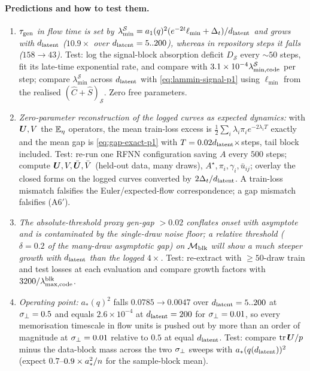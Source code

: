\paragraph{Predictions and how to test them.}
\begin{enumerate}
\item \emph{$\tau_{\mathrm{gen}}$ in flow time is set by $\lambda^{\mathcal S}_{\min}=a_1(q)^2(e^{-2t}\ell_{\min}+\Delta_t)/d_{\mathrm{latent}}$ and grows with $d_{\mathrm{latent}}$ ($10.9\times$ over $d_{\mathrm{latent}}=5..200$), whereas in repository steps it falls ($158\to43$).} Test: log the signal-block absorption deficit $D_{\mathcal S}$ every $\sim50$ steps, fit its late-time exponential rate, and compare with $3.1\times10^{-4}\lambda^{\mathcal S}_{\min,\rm code}$ per step; compare $\lambda^{\mathcal S}_{\min}$ across $d_{\mathrm{latent}}$ with \eqref{eq:lammin-signal-p1} using $\ell_{\min}$ from the realised $(\hat C+\hat S)_{\mathcal S}$. Zero free parameters.
\item \emph{Zero-parameter reconstruction of the logged curves as expected dynamics:} with $\bm{U},V$ the $\mathbb{E}_\eta$ operators, the mean train-loss excess is $\tfrac12\sum_i\lambda_i\pi_ie^{-2\lambda_iT}$ exactly and the mean gap is \eqref{eq:gap-exact-p1} with $T=0.02d_{\mathrm{latent}}\times$steps, tail block included. Test: re-run one RFNN configuration saving $A$ every $500$ steps; compute $\bm{U},V,\bar{\bm{U}},\bar V$ (held-out data, many draws), $A^\star,\pi_i,\gamma_i,\bar u_{ij}$; overlay the closed forms on the logged curves converted by $2\Delta_t/d_{\mathrm{latent}}$. A train-loss mismatch falsifies the Euler/expected-flow correspondence; a gap mismatch falsifies (A6$'$).
\item \emph{The absolute-threshold proxy gen-gap $>0.02$ conflates onset with asymptote and is contaminated by the single-draw noise floor; a relative threshold ($\delta=0.2$ of the many-draw asymptotic gap) on $\mathcal M_{\rm blk}$ will show a much steeper growth with $d_{\mathrm{latent}}$ than the logged $4\times$.} Test: re-extract with $\ge50$-draw train and test losses at each evaluation and compare growth factors with $3200/\lambda^{\rm blk}_{\max,\rm code}$.
\item \emph{Operating point:} $a_*(q)^2$ falls $0.0785\to0.0047$ over $d_{\mathrm{latent}}=5..200$ at $\sigma_{\perp}=0.5$ and equals $2.6\times10^{-4}$ at $d_{\mathrm{latent}}=200$ for $\sigma_{\perp}=0.01$, so every memorisation timescale in flow units is pushed out by more than an order of magnitude at $\sigma_{\perp}=0.01$ relative to $0.5$ at equal $d_{\mathrm{latent}}$. Test: compare $\operatorname{tr}\bm{U}/p$ minus the data-block mass across the two $\sigma_{\perp}$ sweeps with $a_*(q(d_{\mathrm{latent}}))^2$ (expect $0.7$--$0.9\times a_*^2/n$ for the sample-block mean).

\end{enumerate}
